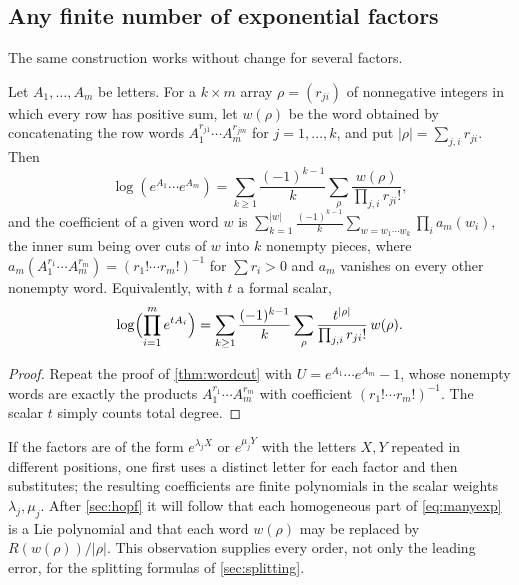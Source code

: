 \subsection{Any finite number of exponential factors}\label{sec:manyexp}
The same construction works without change for several factors.
\begin{corollary}\label{cor:manyexp}
Let $A_1,\ldots,A_m$ be letters. For a $k\times m$ array
$\rho=(r_{ji})$ of nonnegative integers in which every row has positive
sum, let $w(\rho)$ be the word obtained by concatenating the row words
$A_1^{r_{j1}}\cdots A_m^{r_{jm}}$ for $j=1,\ldots,k$, and put
$|\rho|=\sum_{j,i}r_{ji}$. Then
\begin{equation}\label{eq:manyexp}
 \log(e^{A_1}\cdots e^{A_m})
 =\sum_{k\geq1}\frac{(-1)^{k-1}}{k}
   \sum_{\rho}\frac{w(\rho)}{\prod_{j,i}r_{ji}!},
\end{equation}
and the coefficient of a given word $w$ is
$\sum_{k=1}^{|w|}\frac{(-1)^{k-1}}{k}\sum_{w=w_1\cdots w_k}\prod_ia_m(w_i)$,
the inner sum being over cuts of $w$ into $k$ nonempty pieces, where
$a_m(A_1^{r_1}\cdots A_m^{r_m})=(r_1!\cdots r_m!)^{-1}$ for $\sum r_i>0$ and
$a_m$ vanishes on every other nonempty word.
Equivalently, with $t$ a formal scalar,
\begin{equation}\label{eq:multibch}
 \log\Bigl(\prod_{i=1}^{m}e^{tA_i}\Bigr)
 =\sum_{k\geq1}\frac{(-1)^{k-1}}{k}
 \sum_{\rho}\frac{t^{|\rho|}}{\prod_{j,i}r_{ji}!}\,w(\rho).
\end{equation}
\end{corollary}
\begin{proof}
Repeat the proof of \cref{thm:wordcut} with $U=e^{A_1}\cdots e^{A_m}-1$,
whose nonempty words are exactly the products $A_1^{r_1}\cdots A_m^{r_m}$
with coefficient $(r_1!\cdots r_m!)^{-1}$. The scalar $t$ simply counts
total degree.
\end{proof}
If the factors are of the form $e^{\lambda_jX}$ or $e^{\mu_jY}$ with the
letters $X,Y$ repeated in different positions, one first uses a distinct
letter for each factor and then substitutes; the resulting coefficients are
finite polynomials in the scalar weights $\lambda_j,\mu_j$. After
\cref{sec:hopf} it will follow that each homogeneous part of
\eqref{eq:manyexp} is a Lie polynomial and that each word $w(\rho)$ may be
replaced by $R(w(\rho))/|\rho|$. This observation supplies every order, not
only the leading error, for the splitting formulas of \cref{sec:splitting}.
